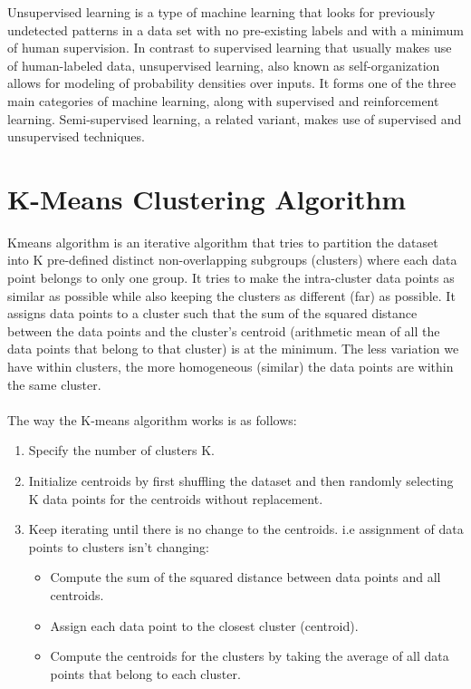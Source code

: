 Unsupervised learning is a type of machine learning that looks for previously undetected patterns in a data set with no pre-existing labels and with a minimum of human supervision. In contrast to supervised learning that usually makes use of human-labeled data, unsupervised learning, also known as self-organization allows for modeling of probability densities over inputs. It forms one of the three main categories of machine learning, along with supervised and reinforcement learning. Semi-supervised learning, a related variant, makes use of supervised and unsupervised techniques.

\section{K-Means Clustering Algorithm}
    Kmeans algorithm is an iterative algorithm that tries to partition the dataset into K pre-defined distinct non-overlapping subgroups (clusters) where each data point belongs to only one group. It tries to make the intra-cluster data points as similar as possible while also keeping the clusters as different (far) as possible. It assigns data points to a cluster such that the sum of the squared distance between the data points and the cluster’s centroid (arithmetic mean of all the data points that belong to that cluster) is at the minimum. The less variation we have within clusters, the more homogeneous (similar) the data points are within the same cluster.\\\\

    The way the K-means algorithm works is as follows:
    \begin{enumerate}
        \item Specify the number of clusters K.
        \item Initialize centroids by first shuffling the dataset and then randomly selecting K data points for the centroids without replacement.
        \item Keep iterating until there is no change to the centroids. i.e assignment of data points to clusters isn’t changing: 
        \begin{itemize}
            \item Compute the sum of the squared distance between data points and all centroids.
            \item Assign each data point to the closest cluster (centroid).
            \item Compute the centroids for the clusters by taking the average of all data points that belong to each cluster.
        \end{itemize}
    \end{enumerate}

